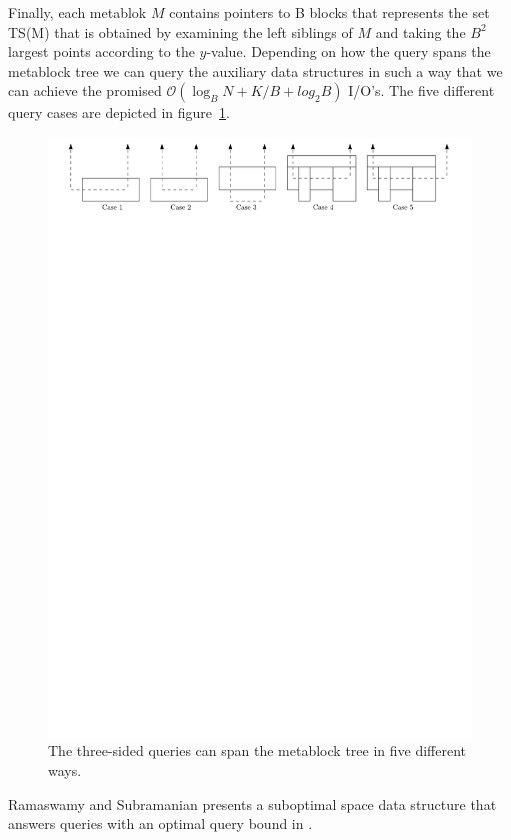 \documentclass[twoside,11pt,openright]{report}
\begin{document}
Finally, each metablok $M$ contains pointers to B blocks that represents the set TS(M) that is obtained by examining the left siblings of $M$ and taking the $B^2$ largest points according to the $y$-value. Depending on how the query spans the metablock tree we can query the auxiliary data structures in such a way that we can achieve the promised $\mathcal{O}(\log_B N + K/B + log_2 B)$ I/O's. The five different query cases are depicted in figure~\ref{fig:kanellakis_queries}.

\begin{figure}[h]
	\centering
		\includegraphics[width=1\textwidth]{../figures/kanellakis_queries}
	\caption{The three-sided queries can span the metablock tree in five different ways.}
	\label{fig:kanellakis_queries}
\end{figure}

Ramaswamy and Subramanian presents a suboptimal space data structure that answers queries with an optimal query bound in \cite{Ramaswamy:1994:PCT:182591.182595}.
\end{document}
